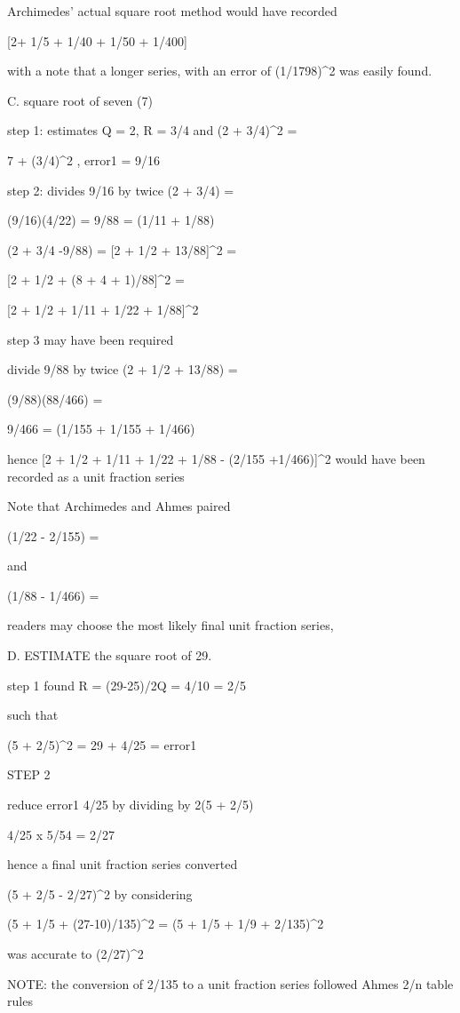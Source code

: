 \documentclass[12pt]{article}
\begin{document}
Archimedes' actual square root method  would have recorded

[2+ 1/5 + 1/40 + 1/50 + 1/400]

with a note that a longer series, with an error of (1/1798)^2 was easily found.

C. square root of seven (7)

step 1: estimates Q = 2, R = 3/4 and (2 + 3/4)^2 =

7 + (3/4)^2 , error1 = 9/16

step 2: divides 9/16 by twice (2 + 3/4) =

(9/16)(4/22) = 9/88 = (1/11 + 1/88)

(2 + 3/4 -9/88) = [2 + 1/2 + 13/88]^2 =

[2 + 1/2 + (8 + 4 + 1)/88]^2 =

[2 + 1/2 + 1/11 + 1/22 + 1/88]^2

step 3 may have been required

divide 9/88 by twice (2 + 1/2 + 13/88) =

(9/88)(88/466) =

9/466 = (1/155 + 1/155 + 1/466)

hence [2 + 1/2 + 1/11 + 1/22 + 1/88 - (2/155 +1/466)]^2 would have been recorded as a unit fraction series

Note that Archimedes and Ahmes paired

(1/22 - 2/155) =

and

(1/88 - 1/466) =

readers may choose the most likely final unit fraction series,

D. ESTIMATE the square root of 29.

step 1 found R = (29-25)/2Q = 4/10 = 2/5

such that 

(5 + 2/5)^2 = 29 + 4/25 = error1

STEP 2

reduce error1 4/25 by dividing by 2(5 + 2/5)

4/25 x 5/54 = 2/27

hence a final unit fraction series converted

(5 + 2/5 - 2/27)^2 by considering

(5 + 1/5 + (27-10)/135)^2 = (5 + 1/5 + 1/9 + 2/135)^2

was accurate to (2/27)^2

NOTE: the conversion of 2/135 to a unit fraction series followed Ahmes 2/n table rules
\end{document}
